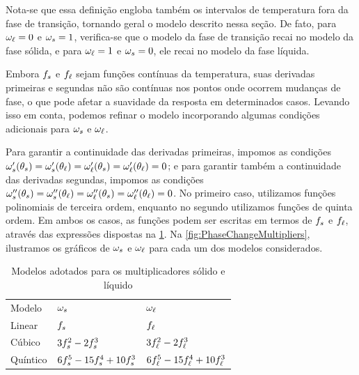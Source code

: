 \documentclass[Tese.tex]{subfiles}
\begin{document}
Nota-se que essa definição engloba também os intervalos de temperatura fora da fase de transição, tornando geral o modelo descrito nessa seção. De fato, para $\omega_\ell = 0$ e $\omega_s = 1$, verifica-se que o modelo da fase de transição recai no modelo da fase sólida, e para $\omega_\ell = 1$ e $\omega_s = 0$, ele recai no modelo da fase líquida.

Embora $f_s$ e $f_\ell$ sejam funções contínuas da temperatura, suas derivadas primeiras e segundas não são contínuas nos pontos onde ocorrem mudanças de fase, o que pode afetar a suavidade da resposta em determinados casos. Levando isso em conta, podemos refinar o modelo incorporando algumas condições adicionais para $\omega_s$ e $\omega_\ell$.

Para garantir a continuidade das derivadas primeiras, impomos as condições $\omega_s'(\theta_s) = \omega_s'(\theta_\ell) = \omega_\ell'(\theta_s) = \omega_\ell'(\theta_\ell) = 0$; e para garantir também a continuidade das derivadas segundas, impomos as condições $\omega_s''(\theta_s) = \omega_s''(\theta_\ell) = \omega_\ell''(\theta_s) = \omega_\ell''(\theta_\ell) = 0$. No primeiro caso, utilizamos funções polinomiais de terceira ordem, enquanto no segundo utilizamos funções de quinta ordem. Em ambos os casos, as funções podem ser escritas em termos de $f_s$ e $f_\ell$, através das expressões dispostas na \cref{tab:modelos}. Na \cref{fig:PhaseChangeMultipliers}, ilustramos os gráficos de $\omega_s$ e $\omega_\ell$ para cada um dos modelos considerados.

\begin{table}[!htb]
	\centering
	\caption{Modelos adotados para os multiplicadores sólido e líquido}
	\small
	\label{tab:modelos}
	{\def\arraystretch{1.5}
		\begin{tabular}{lll}
			\hline
			\rowcolor{LightGray}
			Modelo & $\omega_s$ & $\omega_\ell$ \\ 
			Linear & $f_s$ & $f_\ell$ \\
			Cúbico & $3f_s^2 - 2f_s^3$ & $3f_\ell^2 - 2f_\ell^3$ \\
			Quíntico & $6f_s^5 - 15f_s^4 + 10f_s^3$ & $6f_\ell^5 - 15f_\ell^4 + 10f_\ell^3$ \\ \hline

		\end{tabular}
	}
\end{table}
\end{document}
